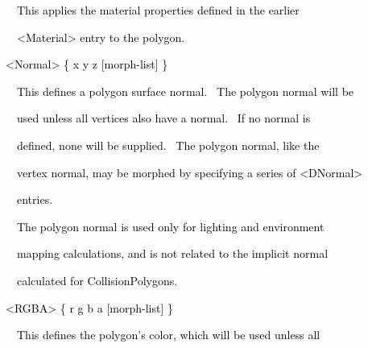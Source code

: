 \documentclass[a4paper]{article}
\newcommand\textstyleOOoComputerKeyWord[1]{\textrm{\textcolor[rgb]{0.0,0.0,0.5019608}{#1}}}
\begin{document}
\bigskip

{\color{black}
\textstyleOOoComputerKeyWord{\textcolor{black}{\ \ \ \ This applies the material properties defined in the earlier}}}

\clearpage
\bigskip

{\color{black}
\textstyleOOoComputerKeyWord{\textcolor{black}{\ \ \ \ {\textless}Material{\textgreater} entry to the polygon.}}}


\bigskip


\bigskip

{\color{black}
\textstyleOOoComputerKeyWord{\textcolor{black}{\ \ {\textless}Normal{\textgreater} \{ x y z [morph-list] \}}}}


\bigskip

{\color{black}
\textstyleOOoComputerKeyWord{\textcolor{black}{\ \ \ \ This defines a polygon surface normal. \ The polygon normal will
be}}}

{\color{black}
\textstyleOOoComputerKeyWord{\textcolor{black}{\ \ \ \ used unless all vertices also have a normal. \ If no normal is}}}

{\color{black}
\textstyleOOoComputerKeyWord{\textcolor{black}{\ \ \ \ defined, none will be supplied. \ The polygon normal, like the}}}

{\color{black}
\textstyleOOoComputerKeyWord{\textcolor{black}{\ \ \ \ vertex normal, may be morphed by specifying a series of
{\textless}DNormal{\textgreater}}}}

{\color{black}
\textstyleOOoComputerKeyWord{\textcolor{black}{\ \ \ \ entries. \ }}}


\bigskip

{\color{black}
\textstyleOOoComputerKeyWord{\textcolor{black}{\ \ \ \ The polygon normal is used only for lighting and environment}}}

{\color{black}
\textstyleOOoComputerKeyWord{\textcolor{black}{\ \ \ \ mapping calculations, and is not related to the implicit
normal}}}

{\color{black}
\textstyleOOoComputerKeyWord{\textcolor{black}{\ \ \ \ calculated for CollisionPolygons.}}}


\bigskip


\bigskip

{\color{black}
\textstyleOOoComputerKeyWord{\textcolor{black}{\ \ {\textless}RGBA{\textgreater} \{ r g b a [morph-list] \}}}}


\bigskip

{\color{black}
\textstyleOOoComputerKeyWord{\textcolor{black}{\ \ \ \ This defines the polygon's color, which will be used unless
all}}}
\end{document}
